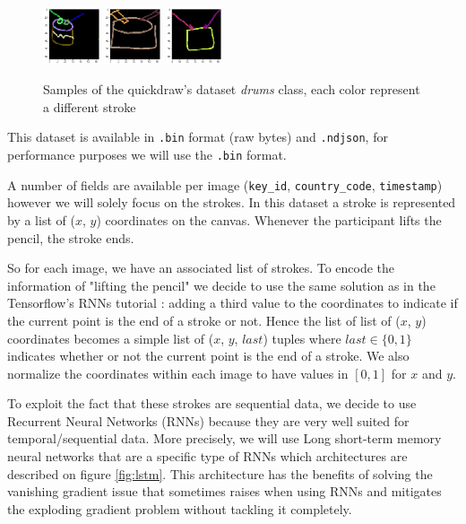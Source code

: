 \documentclass[10pt,twocolumn,letterpaper]{article}
\begin{document}
\begin{figure}[h] 
\centering
\includegraphics[width=0.15\textwidth]{images/drums_quickdraw_strokes_202.png}
\includegraphics[width=0.15\textwidth]{images/drums_quickdraw_strokes_25001.png}
\includegraphics[width=0.15\textwidth]{images/drums_quickdraw_strokes_25019.png}
\caption{Samples of the quickdraw's dataset \textit{drums} class, each color represent a different stroke}
\label{fig:drums_strokes}
\end{figure}

This dataset is available in \texttt{.bin} format (raw bytes) and \texttt{.ndjson}, for performance purposes we will use the \texttt{.bin} format.

A number of fields are available per image (\texttt{key\_id}, \texttt{country\_code}, \texttt{timestamp}) however we will solely focus on the strokes. In this dataset a stroke is represented by a list of ($x$, $y$) coordinates on the canvas. Whenever the participant lifts the pencil, the stroke ends.

So for each image, we have an associated list of strokes. To encode the information of "lifting the pencil" we decide to use the same solution as in the Tensorflow's RNNs tutorial \cite{TensorflowTutorial}: adding a third value to the coordinates to indicate if the current point is the end of a stroke or not. Hence the list of list of ($x$, $y$) coordinates becomes a simple list of ($x$, $y$, $last$) tuples where $last \in \{0, 1\}$ indicates whether or not the current point is the end of a stroke. We also normalize the coordinates within each image to have values in $[0, 1]$ for $x$ and $y$.

To exploit the fact that these strokes are sequential data, we decide to use Recurrent Neural Networks (RNNs) because they are very well suited for temporal/sequential data. More precisely, we will use Long short-term memory neural networks \cite{DBLP:journals/corr/GreffSKSS15} that are a specific type of RNNs which architectures are described on figure \ref{fig:lstm}. This architecture has the benefits of solving the vanishing gradient issue that sometimes raises when using RNNs and mitigates the exploding gradient problem without tackling it completely.
\end{document}

